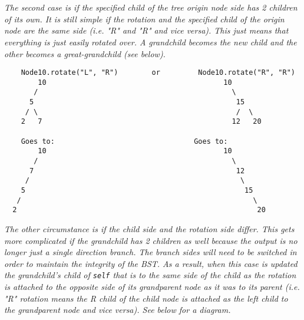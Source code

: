 \documentclass[11pt]{article}
\begin{document}
\begin{enumerate}
\begin{enumerate}
\begin{verbatim}
\end{verbatim}

        \\\\\textit{
        The second case is if the specified child of the tree origin node side has 2 children of its own. It is still simple if the rotation and the specified child of the origin node are the same side (i.e. "R" and "R" and vice versa). This just means that everything is just easily rotated over. A grandchild becomes the new child and the other becomes a great-grandchild (see below). 
        }
\begin{verbatim}
    Node10.rotate("L", "R")        or         Node10.rotate("R", "R")
        10                                          10 
       /                                              \
      5                                                15
     / \                                               /  \
    2   7                                             12   20

    Goes to:                                 Goes to:
        10                                          10 
       /                                              \
      7                                                12
     /                                                  \
    5                                                    15
   /                                                       \
  2                                                         20

\end{verbatim}
        \textit{The other circumstance is if the child side and the rotation side differ. This gets more complicated if the grandchild has 2 children as well because the output is no longer just a single direction branch. The branch sides will need to be switched in order to maintain the integrity of the BST. As a result, when this case is updated the grandchild's child of \texttt{self} that is to the same side of the child as the rotation is attached to the opposite side of its grandparent node as it was to its parent (i.e. "R" rotation means the R child of the child node is attached as the left child to the grandparent node and vice versa). See below for a diagram.}


\end{enumerate}
\end{enumerate}
\end{document}
